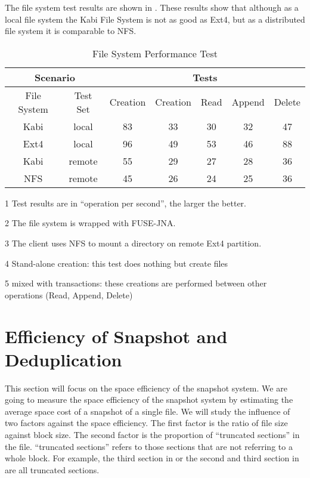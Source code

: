     The file system test results are shown in . These results show that although as a local file system the Kabi File System is not as good as Ext4, but as a distributed file system it is comparable to NFS.

\begin{table}[t]
\begin{center}
\begin{threeparttable}
\begin{tabular}{|c|c|c|c|c|c|c|}
\hline
\multicolumn{2}{|c|}{Scenario} & \multicolumn{5}{c|}{Tests\tnote{1}} \\
\hline
File System & Test Set & Creation\tnote{4} & Creation\tnote{5} & Read & Append & Delete\\
\hline
Kabi & local & 83 & 33 & 30 & 32 & 47 \\
\hline
Ext4\tnote{2}& local & 96 & 49 & 53 & 46 & 88 \\
\hline
Kabi & remote & 55 & 29 & 27 & 28 & 36 \\
\hline
NFS \tnote{2,3} & remote & 45 & 26 & 24 & 25 & 36 \\
\hline
\end{tabular}
\begin{tablenotes}
\item[1] Test results are in ``operation per second'', the larger the better.
\item[2] The file system is wrapped with FUSE-JNA.
\item[3] The client uses NFS to mount a directory on remote Ext4 partition.
\item[4] Stand-alone creation: this test does nothing but create files
\item[5] mixed with transactions: these creations are performed between other operations (Read, Append, Delete)
\end{tablenotes}
\end{threeparttable}
\end{center}
\caption{File System Performance Test}
\label{tab:fs_performance}
\end{table}

\section {Efficiency of Snapshot and Deduplication}

    This section will focus on the space efficiency of the snapshot system. We are going to measure the space efficiency of the snapshot system by estimating the average space cost of a snapshot of a single file. We will study the influence of two factors against the space efficiency. The first factor is the ratio of file size against block size. The second factor is the proportion of ``truncated sections'' in the file. ``truncated sections'' refers to those sections that are not referring to a whole block. For example, the third section in  or the second and third section in  are all truncated sections.

